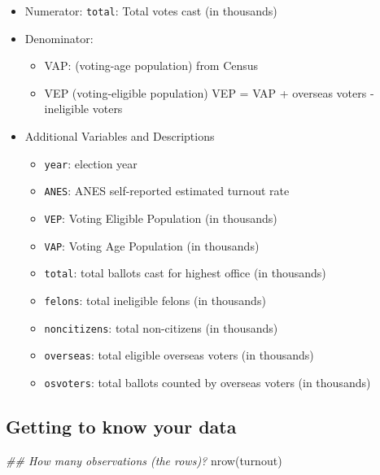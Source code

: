 \documentclass[
  letterpaper,
  DIV=11,
  numbers=noendperiod]{scrreprt}
\newenvironment{Shaded}{\begin{snugshade}}{\end{snugshade}}
\newcommand{\DocumentationTok}[1]{\textcolor[rgb]{0.37,0.37,0.37}{\textit{#1}}}
\newcommand{\FunctionTok}[1]{\textcolor[rgb]{0.28,0.35,0.67}{#1}}
\newcommand{\NormalTok}[1]{\textcolor[rgb]{0.00,0.23,0.31}{#1}}
\providecommand{\tightlist}{%
  \setlength{\itemsep}{0pt}\setlength{\parskip}{0pt}}\usepackage{longtable,booktabs,array}
\begin{document}
\begin{itemize}
\tightlist
\item
  Numerator: \texttt{total}: Total votes cast (in thousands)
\item
  Denominator:

  \begin{itemize}
  \tightlist
  \item
    VAP: (voting-age population) from Census
  \item
    VEP (voting-eligible population) VEP = VAP + overseas voters -
    ineligible voters
  \end{itemize}
\item
  Additional Variables and Descriptions

  \begin{itemize}
  \tightlist
  \item
    \texttt{year}: election year
  \item
    \texttt{ANES}: ANES self-reported estimated turnout rate
  \item
    \texttt{VEP}: Voting Eligible Population (in thousands)
  \item
    \texttt{VAP}: Voting Age Population (in thousands)
  \item
    \texttt{total}: total ballots cast for highest office (in thousands)
  \item
    \texttt{felons}: total ineligible felons (in thousands)
  \item
    \texttt{noncitizens}: total non-citizens (in thousands)
  \item
    \texttt{overseas}: total eligible overseas voters (in thousands)
  \item
    \texttt{osvoters}: total ballots counted by overseas voters (in
    thousands)
  \end{itemize}
\end{itemize}

\hypertarget{getting-to-know-your-data}{%
\subsection{Getting to know your data}\label{getting-to-know-your-data}}

\begin{Shaded}
\begin{Highlighting}[]
\DocumentationTok{\#\# How many observations (the rows)?}
\FunctionTok{nrow}\NormalTok{(turnout)}
\end{Highlighting}
\end{Shaded}
\end{document}
